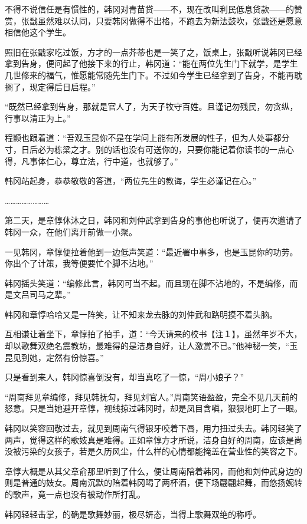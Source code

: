 不得不说信任是有惯性的，韩冈对青苗贷——不，现在改叫利民低息贷款——的赞赏，张戬虽然难以认同，只要韩冈做得不出格，不跑去为新法鼓吹，张戬还是愿意相信他这个学生。

照旧在张戬家吃过饭，方才的一点芥蒂也是一笑了之，饭桌上，张戬听说韩冈已经拿到告身，便问起了他接下来的行止，韩冈道：“能在两位先生门下就学，是学生几世修来的福气，惟愿能常随先生门下。不过如今学生已经拿到了告身，不能再耽搁了，现定得后日启程。”

“既然已经拿到告身，那就是官人了，为天子牧守百姓。且谨记勿残民，勿贪纵，行事以清正为上。”

程颢也跟着道：“吾观玉昆你不是在学问上能有所发展的性子，但为人处事都分寸，日后必为栋梁之才。别的话也没有可送你的，只要你能记着你读书的一点心得，凡事体仁心，尊立法，行中道，也就够了。”

韩冈站起身，恭恭敬敬的答道，“两位先生的教诲，学生必谨记在心。”

……………………

第二天，是章惇休沐之日，韩冈和刘仲武拿到告身的事他也听说了，便再次邀请了韩冈一众，在他们离开前做一小聚。

一见韩冈，章惇便拉着他到一边低声笑道：“最近署中事多，也是玉昆你的功劳。你出个了计策，我等便要忙个脚不沾地。”

韩冈摇头笑道：“编修此言，韩冈可当不起。而且现在脚不沾地的，不是编修，而是文吕司马之辈。”

韩冈和章惇哈哈又是一阵笑，让不知来龙去脉的刘仲武和路明摸不着头脑。

互相谦让着坐下，章惇拍了拍手，道：“今天请来的校书【注１】，虽然年岁不大，却以歌舞双绝名震教坊，最难得的是洁身自好，让人激赏不已。”他神秘一笑，“玉昆见到她，定然有份惊喜。”

只是看到来人，韩冈惊喜倒没有，却当真吃了一惊，“周小娘子？”

“周南拜见章编修，拜见韩抚勾，拜见刘官人。”周南笑语盈盈，完全不见几天前的怒意。只是当她避开章惇，视线掠过韩冈时，却是凤目含嗔，狠狠地盯上了一眼。

韩冈以笑容回敬过去，就见到周南气得银牙咬着下唇，用力扭过头去。韩冈轻笑了两声，觉得这样的歌妓真是难得。正如章惇方才所说，洁身自好的周南，应该是尚没被污染的女孩子，若是久历风尘，什么样的心情都能掩盖在营业性的笑容之下。

章惇大概是从其父章俞那里听到了什么，便让周南陪着韩冈，而他和刘仲武身边的则是普通的妓女。周南沉默的陪着韩冈喝了两杯酒，便下场翩翩起舞，而悠扬婉转的歌声，竟一点也没有被动作所打乱。

韩冈轻轻击掌，的确是歌舞妙丽，极尽妍态，当得上歌舞双绝的称呼。

